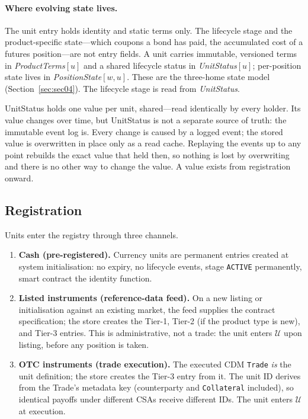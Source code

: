 \paragraph{Where evolving state lives.}
The unit entry holds identity and static terms only. The lifecycle stage and the product-specific state---which coupons a bond has paid, the accumulated cost of a futures position---are not entry fields. A unit carries immutable, versioned terms in \emph{ProductTerms}$[u]$ and a shared lifecycle status in \emph{UnitStatus}$[u]$; per-position state lives in \emph{PositionState}$[w,u]$. These are the three-home state model (Section~\ref{sec:sec04}). The lifecycle stage is read from \emph{UnitStatus}.

\begin{remark}
\label{rem:sec03-unitstatus}
UnitStatus holds one value per unit, shared---read identically by every holder. Its value changes over time, but UnitStatus is not a separate source of truth: the immutable event log is. Every change is caused by a logged event; the stored value is overwritten in place only as a read cache. Replaying the events up to any point rebuilds the exact value that held then, so nothing is lost by overwriting and there is no other way to change the value. A value exists from registration onward.
\end{remark}

\subsection{Registration}
\label{sec:sec03-registration}
\label{sec:unit-registration}

Units enter the registry through three channels.

\begin{enumerate}
\item \textbf{Cash (pre-registered).} Currency units are permanent entries created at system initialisation: no expiry, no lifecycle events, stage \texttt{ACTIVE} permanently, smart contract the identity function.
\item \textbf{Listed instruments (reference-data feed).} On a new listing or initialisation against an existing market, the feed supplies the contract specification; the store creates the Tier-1, Tier-2 (if the product type is new), and Tier-3 entries. This is administrative, not a trade: the unit enters $\mathcal{U}$ upon listing, before any position is taken.
\item \textbf{OTC instruments (trade execution).} The executed CDM \texttt{Trade} \emph{is} the unit definition; the store creates the Tier-3 entry from it. The unit ID derives from the Trade's metadata key (counterparty and \texttt{Collateral} included), so identical payoffs under different CSAs receive different IDs. The unit enters $\mathcal{U}$ at execution.
\end{enumerate}

